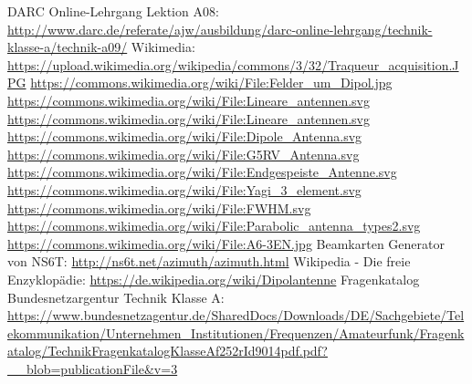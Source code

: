 \begin{thebibliography}{}
      DARC Online-Lehrgang Lektion A08:
                    \url{http://www.darc.de/referate/ajw/ausbildung/darc-online-lehrgang/technik-klasse-a/technik-a09/}
     	Wikimedia:
                    \url{https://upload.wikimedia.org/wikipedia/commons/3/32/Traqueur_acquisition.JPG}
                    \url{https://commons.wikimedia.org/wiki/File:Felder_um_Dipol.jpg}
                    \url{https://commons.wikimedia.org/wiki/File:Lineare_antennen.svg}
                    \url{https://commons.wikimedia.org/wiki/File:Lineare_antennen.svg}
                    \url{https://commons.wikimedia.org/wiki/File:Dipole_Antenna.svg}
                    \url{https://commons.wikimedia.org/wiki/File:G5RV_Antenna.svg}
                    \url{https://commons.wikimedia.org/wiki/File:Endgespeiste_Antenne.svg}
                    \url{https://commons.wikimedia.org/wiki/File:Yagi_3_element.svg}
                    \url{https://commons.wikimedia.org/wiki/File:FWHM.svg}
                    \url{https://commons.wikimedia.org/wiki/File:Parabolic_antenna_types2.svg}
                    \url{https://commons.wikimedia.org/wiki/File:A6-3EN.jpg}
                    \url{}
      Beamkarten Generator von NS6T:
                    \url{http://ns6t.net/azimuth/azimuth.html}
        Wikipedia - Die freie Enzyklopädie:
                    \url{https://de.wikipedia.org/wiki/Dipolantenne}
	   Fragenkatalog Bundesnetzargentur Technik Klasse A:                   
                    \url{https://www.bundesnetzagentur.de/SharedDocs/Downloads/DE/Sachgebiete/Telekommunikation/Unternehmen_Institutionen/Frequenzen/Amateurfunk/Fragenkatalog/TechnikFragenkatalogKlasseAf252rId9014pdf.pdf?__blob=publicationFile&v=3}
\end{thebibliography} 


